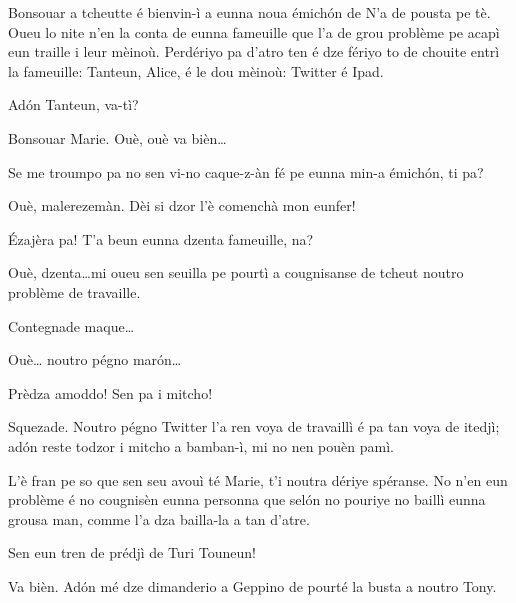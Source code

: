 \begin{drama}
\Mariespeaks Bonsouar a tcheutte é bienvin-ì a eunna noua émich\'on de \og N’a de pousta pe tè\fg. Oueu lo nite n'en la conta de eunna fameuille que l’a de grou problème pe acapì eun traille i leur mèinoù. Perdériyo pa d'atro ten é dze fériyo to de chouite entrì la fameuille: Tanteun, Alice,  é le dou mèinoù: Twitter é Ipad.


\Mariespeaks Ad\'on Tanteun, va-tì?

\Tanteunspeaks{} Bonsouar Marie. Ouè, ouè va bièn\ldots

\Mariespeaks Se me troumpo pa no sen vi-no caque-z-àn fé pe eunna min-a émich\'on, ti pa?

\Tanteunspeaks{} Ouè,  malerezemàn. Dèi si dzor l’è comenchà mon eunfer!

\Mariespeaks \'Ezajèra pa! T’a beun eunna dzenta fameuille, na?

\Tanteunspeaks Ouè, dzenta\ldots mi oueu sen seuilla pe pourtì a cougnisanse de tcheut noutro problème de travaille.

\Mariespeaks Contegnade maque\ldots

\Tanteunspeaks Ouè\ldots {} noutro pégno mar\'on\ldots


\Alicespeaks Prèdza amoddo! Sen pa i mitcho!

\Tanteunspeaks Squezade. Noutro pégno Twitter l’a ren voya de travaillì é pa tan voya de itedjì; ad\'on reste todzor i mitcho a bamban-ì, mi no nen pouèn pamì.

\Alicespeaks L’è fran pe so que sen seu avouì té Marie, t’i noutra dériye spéranse. No n'en eun problème é no cougnisèn eunna personna que sel\'on no pouriye no baillì eunna grousa man, comme  l’a dza bailla-la a tan d’atre.

\Twitterspeaks{} Sen eun tren de prédjì de Turi Touneun!

\Mariespeaks Va bièn. Ad\'on mé dze dimanderio a Geppino de pourté la busta a noutro Tony.



\end{drama}
